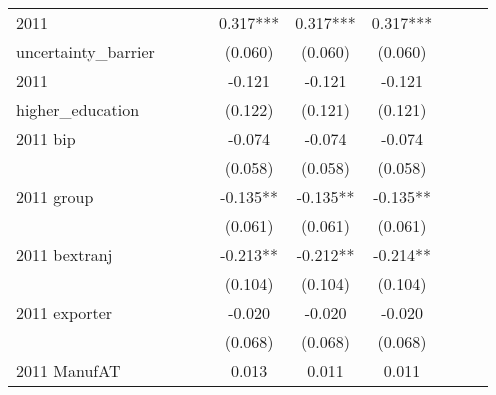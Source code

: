 \begin{table}[htbp]
\begin{tabular}{l*{9}{c}}
2011                &               &               &               &       0.317***&       0.317***&       0.317***&               &               &               \\
uncertainty\_barrier &               &               &               &     (0.060)   &     (0.060)   &     (0.060)   &               &               &               \\
2011                &               &               &               &      -0.121   &      -0.121   &      -0.121   &               &               &               \\
higher\_education    &               &               &               &     (0.122)   &     (0.121)   &     (0.121)   &               &               &               \\
2011 bip            &               &               &               &      -0.074   &      -0.074   &      -0.074   &               &               &               \\
                    &               &               &               &     (0.058)   &     (0.058)   &     (0.058)   &               &               &               \\
2011 group          &               &               &               &      -0.135** &      -0.135** &      -0.135** &               &               &               \\
                    &               &               &               &     (0.061)   &     (0.061)   &     (0.061)   &               &               &               \\
2011 bextranj       &               &               &               &      -0.213** &      -0.212** &      -0.214** &               &               &               \\
                    &               &               &               &     (0.104)   &     (0.104)   &     (0.104)   &               &               &               \\
2011 exporter       &               &               &               &      -0.020   &      -0.020   &      -0.020   &               &               &               \\
                    &               &               &               &     (0.068)   &     (0.068)   &     (0.068)   &               &               &               \\
2011 ManufAT        &               &               &               &       0.013   &       0.011   &       0.011   &               &               &               \\

\end{tabular}
\end{table}
